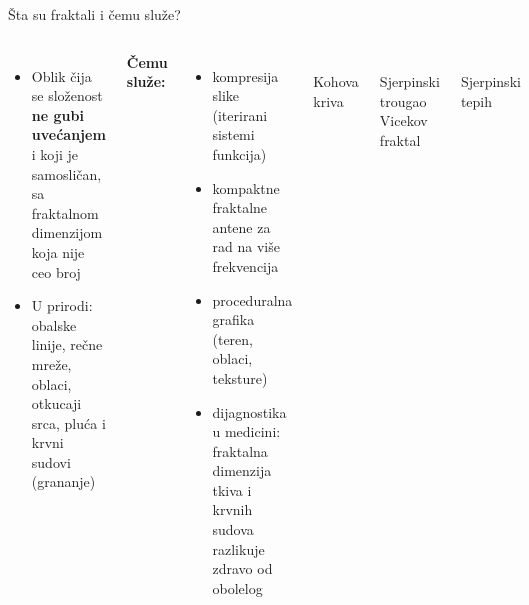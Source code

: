 \documentclass[aspectratio=169,11pt]{beamer}
\begin{document}
\begin{frame}{Šta su fraktali i čemu služe?}
  \vspace{-0.2cm}
  \begin{columns}[T]
      \footnotesize
      \begin{itemize}
        \item Oblik čija se složenost \textbf{ne gubi uvećanjem} i koji je samosličan, sa fraktalnom dimenzijom koja nije ceo broj
        \item U prirodi: obalske linije, rečne mreže, oblaci, otkucaji srca, pluća i krvni sudovi (grananje)
      \end{itemize}
      \vspace{0.15em}
      \textbf{Čemu služe:}
      \begin{itemize}
        \item kompresija slike (iterirani sistemi funkcija)
        \item kompaktne fraktalne antene za rad na više frekvencija
        \item proceduralna grafika (teren, oblaci, teksture)
        \item dijagnostika u medicini: fraktalna dimenzija tkiva i krvnih sudova razlikuje zdravo od obolelog
      \end{itemize}
      \normalsize
      \centering
      \\[0.05em]
      {\scriptsize\color{graytext} Kohova kriva}\\[0.5em]
      \begin{tikzpicture}[x=1.2cm,y=1.2cm]
        
      \end{tikzpicture}\hspace{0.35em}
      \begin{tikzpicture}[x=1.2cm,y=1.2cm]
        
      \end{tikzpicture}\\[0.1em]
      {\scriptsize\color{graytext} Sjerpinski trougao \hspace{0.5em} Vicekov fraktal}\\[0.5em]
      \begin{tikzpicture}[x=1.2cm,y=1.2cm]
        
      \end{tikzpicture}\\[0.05em]
      {\scriptsize\color{graytext} Sjerpinski tepih}
  \end{columns}
\end{frame}
\end{document}
